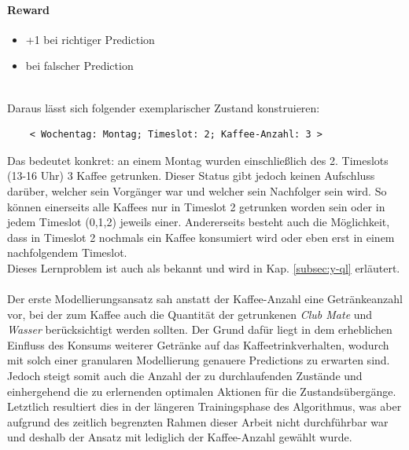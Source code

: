 \paragraph{Reward}
\begin{itemize}
	\item +1 bei richtiger Prediction
	\item {} bei falscher Prediction
\end{itemize}
\ \\
Daraus lässt sich folgender exemplarischer Zustand konstruieren: 
\begingroup
\makeatletter
\@totalleftmargin=0.5cm
\begin{Verbatim}
	< Wochentag: Montag; Timeslot: 2; Kaffee-Anzahl: 3 >
\end{Verbatim}
\endgroup
Das bedeutet konkret: an einem Montag wurden einschließlich des 2. Timeslots (13-16 Uhr) 3 Kaffee getrunken. Dieser Status gibt jedoch keinen Aufschluss darüber, welcher sein Vorgänger war und welcher sein Nachfolger sein wird. So können einerseits alle Kaffees nur in Timeslot 2 getrunken worden sein oder in jedem Timeslot (0,1,2) jeweils einer. Andererseits besteht auch die Möglichkeit, dass in Timeslot 2 nochmals ein Kaffee konsumiert wird oder eben erst in einem nachfolgendem Timeslot.\\
Dieses Lernproblem ist auch als  bekannt und wird in Kap. \ref{subsec:y-ql} erläutert.
\\\\
Der erste Modellierungsansatz sah anstatt der Kaffee-Anzahl eine Getränkeanzahl vor, bei der zum Kaffee auch die Quantität der getrunkenen \textit{Club Mate} und \textit{Wasser} berücksichtigt werden sollten. Der Grund dafür liegt in dem erheblichen Einfluss des Konsums weiterer Getränke auf das Kaffeetrinkverhalten, wodurch mit solch einer granularen Modellierung genauere Predictions zu erwarten sind. Jedoch steigt somit auch die Anzahl der zu durchlaufenden Zustände und einhergehend die zu erlernenden optimalen Aktionen für die Zustandsübergänge. Letztlich resultiert dies in der längeren Trainingsphase des Algorithmus, was aber aufgrund des zeitlich begrenzten Rahmen dieser Arbeit nicht durchführbar war und deshalb der Ansatz mit lediglich der Kaffee-Anzahl gewählt wurde.

